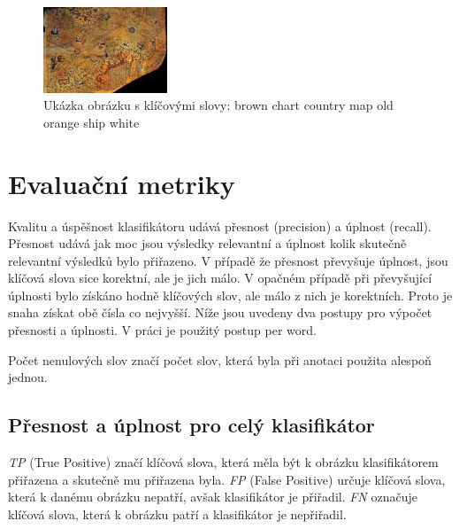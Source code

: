 \documentclass[czech,BP]{thesiskiv}
\begin{document}
\begin{figure}[h]
		\centering
		\includegraphics[width=140px]{./img/esp.jpg}	
		\caption{Ukázka obrázku s klíčovými slovy: brown chart country map old orange ship white}
\end{figure}



\chapter{Evaluační metriky}
\par Kvalitu a úspěšnost klasifikátoru udává přesnost (precision) a úplnost (recall). Přesnost udává jak moc jsou výsledky relevantní a úplnost kolik skutečně relevantní výsledků bylo přiřazeno. V případě že přesnost převyšuje úplnost, jsou klíčová slova sice korektní, ale je jich málo. V opačném případě při převyšující úplnosti bylo získáno hodně klíčových slov, ale málo z nich je korektních. Proto je snaha získat obě čísla co nejvyšší. Níže jsou uvedeny dva postupy pro výpočet přesnosti a úplnosti. V práci je použitý postup per word. \cite{Result_A_A}  
\par Počet nenulových slov značí počet slov, která byla při anotaci použita alespoň jednou. 

\section{Přesnost a úplnost pro celý klasifikátor}
\par \textit{TP} (True Positive) značí klíčová slova, která měla být k obrázku klasifikátorem přiřazena a skutečně mu přiřazena byla. \textit{FP} (False Positive) určuje klíčová slova, která k danému obrázku nepatří, avšak klasifikátor je přiřadil. \textit{FN} označuje klíčová slova, která k obrázku patří a klasifikátor je nepřiřadil. 
\end{document}
